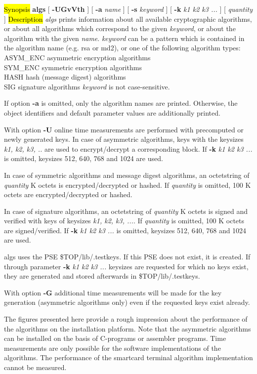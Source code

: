 \label{algs}
\hl{Synopsis}
{\bf algs} [ {\bf -UGvVth} ] [ {\bf -a} {\em name} ] [ {\bf -s} {\em keyword} ] [ {\bf -k} {\em k1 k2 k3 ...} ] [ {\em quantity} ]
\hl{Description}
{\em algs} prints information about all available cryptographic algorithms, or about all algorithms 
which correspond to the given {\em keyword}, or about the algorithm with the given {\em name}.
{\em keyword} can be a pattern which is contained in the algorithm name (e.g. rsa or md2), or one of the 
following algorithm types:
\bvtab
ASYM\_ENC \4 asymmetric encryption algorithms \\
SYM\_ENC  \4 symmetric encryption algorithms  \\
HASH      \4 hash (message digest) algorithms \\
SIG       \4 signature algorithms  
\evtab
{\em keyword} is not case-sensitive.

If option {\bf -a} is omitted, only the algorithm names are printed. 
Otherwise, the object identifiers and default parameter values are additionally printed. 

With option {\bf -U} online time measurements are performed with precomputed or newly generated keys. 
In case of asymmetric algorithms, keys with the keysizes {\em k1, k2, k3, ..} are used to 
encrypt/decrypt a corresponding block. If {\bf -k} {\em k1 k2 k3 ...} is omitted, keysizes
512, 640, 768 and 1024 are used.

In case of symmetric algorithms and message digest algorithms, an octetstring of {\em quantity} K
octets is encrypted/decrypted or hashed. If {\em quantity} is omitted, 100 K octets are
encrypted/decrypted or hashed.

In case of signature algorithms, an octetstring of {\em quantity} K octets is signed
and verified with keys of keysizes {\em k1, k2, k3, ...}. If {\em quantity} is omitted, 100 K octets are 
signed/verified. If {\bf -k} {\em k1 k2 k3 ...} is omitted, keysizes 512, 640, 768 and 1024 are used.

algs uses the PSE \$TOP/lib/.testkeys. If this PSE does not exist, it is created. If through
parameter {\bf -k} {\em k1 k2 k3 ...} keysizes are requested for which no keys exist,
they are generated and stored afterwards in \$TOP/lib/.testkeys.

With option {\bf -G} additional time measurements will be made for the key generation (asymmetric 
algorithms only) even if the requested keys exist already.

The figures presented here provide a rough impression about the performance of the algorithms on the 
installation platform. Note that the asymmetric algorithms can be installed on the
basis of C-programs or assembler programs. Time measurements are only possible for the software 
implementations of the algorithms. The performance of the smartcard terminal algorithm
implementation cannot be measured.

